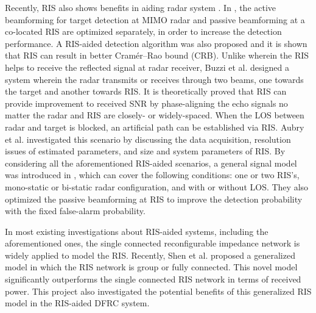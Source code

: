 
Recently, RIS also shows benefits in aiding radar system \cite{lu2021intelligent,buzzi2021radar,aubry2021reconfigurable,buzzi2021foundations}.
In \cite{lu2021intelligent}, the active beamforming for target detection at MIMO radar and passive beamforming at a co-located RIS are optimized
separately, in order to increase the detection performance. A RIS-aided detection algorithm was also proposed and it is shown that RIS can result in 
better Cramér–Rao bound (CRB). Unlike \cite{lu2021intelligent} wherein the RIS helps to receive the reflected signal at radar receiver, 
Buzzi et al. \cite{buzzi2021radar} designed a system wherein the radar transmits or receives through two beams, one towards the target and another towards RIS.
It is theoretically proved that RIS can provide improvement to received SNR by phase-aligning the echo signals no matter the radar and RIS are closely-
or widely-spaced. When the LOS between radar and target is blocked, an artificial path can be established via RIS. Aubry et al. \cite{aubry2021reconfigurable}
investigated this scenario by discussing the data acquisition, resolution issues of estimated parameters, and size and system parameters of RIS.
By considering all the aforementioned RIS-aided scenarios, a general signal model was introduced in \cite{buzzi2021foundations}, which can 
cover the following conditions: one or two RIS's, mono-static or bi-static radar configuration, and with or without LOS. They also 
optimized the passive beamforming at RIS to improve the detection probability with the fixed false-alarm probability.

In most existing investigations about RIS-aided systems, including the aforementioned ones, the single connected reconfigurable impedance network is widely applied to model 
the RIS. Recently, Shen et al. \cite{shen2020modeling} proposed a generalized model in which the RIS network is group or fully connected. 
This novel model significantly outperforms the single connected RIS network in terms of received power. This project also investigated the potential benefits of this generalized
RIS model in the RIS-aided DFRC system.


